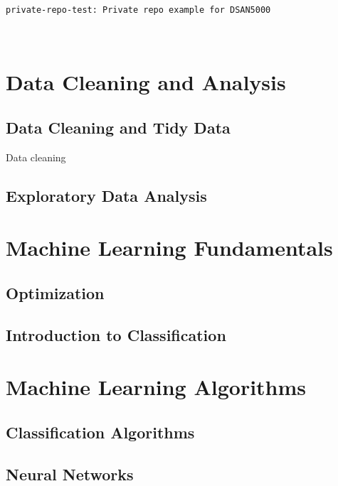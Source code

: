 \documentclass[
  letterpaper,
  DIV=11,
  numbers=noendperiod,
  oneside]{scrreprt}
\begin{document}
\begin{verbatim}
private-repo-test: Private repo example for DSAN5000
\end{verbatim}

~

\part{Data Cleaning and Analysis}

\hypertarget{data-cleaning-and-tidy-data}{%
\chapter{Data Cleaning and Tidy
Data}\label{data-cleaning-and-tidy-data}}

Data cleaning

\hypertarget{exploratory-data-analysis}{%
\chapter{Exploratory Data Analysis}\label{exploratory-data-analysis}}

\part{Machine Learning Fundamentals}

\hypertarget{optimization}{%
\chapter{Optimization}\label{optimization}}

\hypertarget{introduction-to-classification}{%
\chapter{Introduction to
Classification}\label{introduction-to-classification}}

\part{Machine Learning Algorithms}

\hypertarget{classification-algorithms}{%
\chapter{Classification Algorithms}\label{classification-algorithms}}

\hypertarget{neural-networks}{%
\chapter{Neural Networks}\label{neural-networks}}
\end{document}
